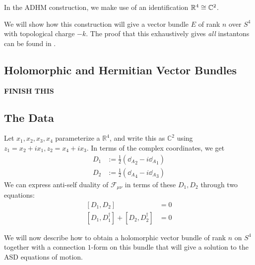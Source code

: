 	In the ADHM construction, we make use of an identification $\mathbb{R}^4 \cong \mathbb{C}^2$. 
	
	We will show how this construction will give a vector bundle $E$ of rank $n$ over $S^4$ with topological charge $-k$. The proof that this exhaustively gives \emph{all} instantons can be found in \cite{donaldson1988}.
	
	\subsection{Holomorphic and Hermitian Vector Bundles} %
	\label{sub:holomorphic_and_hermitian_vector_bundles}
	
	\textbf{FINISH THIS}
	
	
	\subsection{The Data}
	
	Let $x_1, x_2, x_3, x_4$ parameterize a $\mathbb R^4$, and write this as $\mathbb C^2$ using $z_1 = x_2 + i x_1, z_2 = x_4 + i x_3$. In terms of the complex coordinates, we get
	\begin{equation}
		\begin{aligned}
			D_1 &:= \frac{1}{2} ({\dd_A}_2 - i {\dd_A}_1)\\
			D_2 &:= \frac{1}{2} ({\dd_A}_4 - i {\dd_A}_3)
		\end{aligned}
	\end{equation}
	We can express anti-self duality of $\mathcal F_{\mu \nu}$ in terms of these $D_1, D_2$ through two equations:
	\begin{equation}
		\begin{aligned}
			\left[ D_1, D_2 \right] &= 0\\
			[D_1, D_1^\dagger] + [D_2, D_2^\dagger] &= 0
		\end{aligned}
	\end{equation}
	
	We will now describe how to obtain a holomorphic vector bundle of rank $n$ on $S^4$ together with a connection $1$-form on this bundle that will give a solution to the ASD equations of motion. 
	
